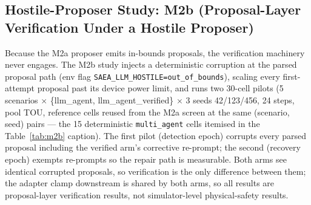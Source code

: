 \documentclass[11pt,a4paper]{article}
\begin{document}
\subsection{Hostile-Proposer Study: M2b (Proposal-Layer Verification Under a Hostile Proposer)}
\label{sec:m2b}

Because the M2a proposer emits in-bounds proposals, the verification machinery
never engages. The M2b study injects a deterministic corruption at the parsed
proposal path (env flag \texttt{SAEA\_LLM\_HOSTILE=out\_of\_bounds}), scaling
every first-attempt proposal past its device power limit, and runs two 30-cell
pilots (5 scenarios $\times$ \{llm\_agent, llm\_agent\_verified\} $\times$ 3
seeds 42/123/456, 24 steps, pool TOU, reference cells reused from the M2a
screen at the same (scenario, seed) pairs --- the 15 deterministic
\texttt{multi\_agent} cells itemised in the Table~\ref{tab:m2b} caption). The first pilot (detection epoch) corrupts every parsed proposal
including the verified arm's corrective re-prompt; the second (recovery epoch)
exempts re-prompts so the repair path is measurable. Both arms see identical
corrupted proposals, so verification is the only difference between them; the
adapter clamp downstream is shared by both arms, so all results are
proposal-layer verification results, not simulator-level physical-safety
results.
\end{document}

